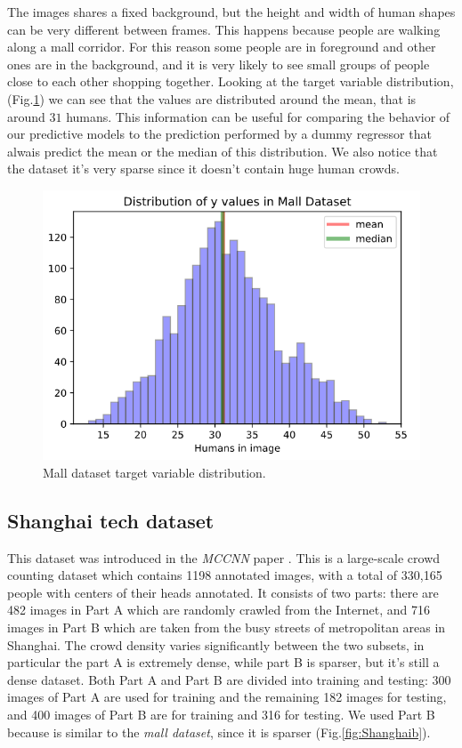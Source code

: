 \documentclass[10pt,twocolumn,letterpaper]{article}
\begin{document}
The images shares a fixed background, but the height and width of human shapes can be very different between frames. This happens because people are walking along a mall corridor. For this reason some people are in foreground and other ones are in the background, and it is very likely to see small groups of people close to each other shopping together. Looking at the target variable distribution, (Fig.\ref{fig:distplot}) we can see that the values are distributed around the mean, that is around  $31$ humans. This information can be useful for comparing the behavior of our predictive models to the prediction performed by a dummy regressor that alwais predict the mean or the median of this distribution. We also notice that the dataset it's very sparse since it doesn't contain huge human crowds.

\begin{figure}[h!]%
	\includegraphics[width=0.8\columnwidth]{pics/meanmedian.png}
	\centering
	\caption{Mall dataset target variable distribution.}
	\centering
	\label{fig:distplot}
\end{figure}

\subsection{Shanghai tech dataset}
This dataset was introduced in the \textit{MCCNN} paper \cite{zhang2016single}. This is a large-scale crowd counting dataset  which contains 1198 annotated images, with
a total of 330,165 people with centers of their heads annotated. It consists of two parts: there are 482 images in Part A which are randomly crawled from the Internet, and 716 images in Part B which are taken from the busy streets of metropolitan areas in Shanghai. The crowd density varies significantly between the two subsets, in particular the part A is extremely dense, while part B is sparser, but it's still a dense dataset. Both Part A and Part B are divided into training and testing: 300
images of Part A are used for training and the remaining 182 images for testing, and 400 images of Part B are for training and 316 for testing. We used Part B because is similar to the \textit{mall dataset}, since it is sparser (Fig.\ref{fig:Shanghaib}).
\end{document}
